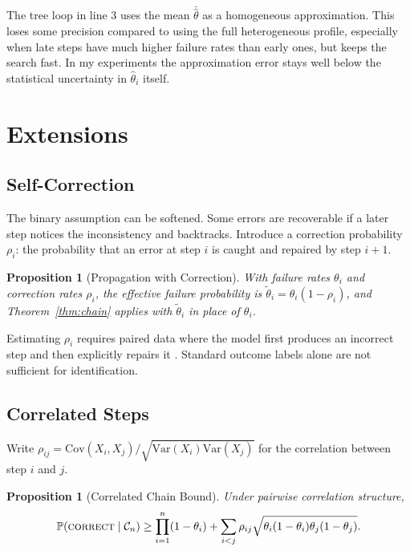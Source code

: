\documentclass[11pt]{article}
\theoremstyle{plain}
\newtheorem{proposition}[theorem]{Proposition}
\theoremstyle{definition}
\newcommand{\Var}{\mathrm{Var}}
\newcommand{\Cov}{\mathrm{Cov}}
\newcommand{\Prob}{\mathbb{P}}
\newcommand{\chain}{\mathcal{C}}
\newcommand{\correct}{\textsc{correct}}
\begin{document}
The tree loop in line 3 uses the mean $\bar{\hat\theta}$ as a homogeneous
approximation. This loses some precision compared to using the full heterogeneous
profile, especially when late steps have much higher failure rates than
early ones, but keeps the search fast. In my experiments the approximation
error stays well below the statistical uncertainty in $\hat\theta_i$ itself.

\section{Extensions}
\label{sec:model-extensions}

\subsection{Self-Correction}

The binary assumption can be softened. Some errors are recoverable if a
later step notices the inconsistency and backtracks. Introduce a correction
probability $\rho_i$: the probability that an error at step $i$ is caught
and repaired by step $i+1$.

\begin{proposition}[Propagation with Correction]\label{prop:correction}
  With failure rates $\theta_i$ and correction rates $\rho_i$, the effective
  failure probability is $\tilde\theta_i = \theta_i(1-\rho_i)$, and
  Theorem~\ref{thm:chain} applies with $\tilde\theta_i$ in place of $\theta_i$.
\end{proposition}

Estimating $\rho_i$ requires paired data where the model first produces an
incorrect step and then explicitly repairs it \citep{madaan2023self}. Standard
outcome labels alone are not sufficient for identification.

\subsection{Correlated Steps}

Write $\rho_{ij} = \Cov(X_i,X_j)/\sqrt{\Var(X_i)\Var(X_j)}$ for the
correlation between step $i$ and $j$.

\begin{proposition}[Correlated Chain Bound]\label{prop:corr}
  Under pairwise correlation structure,
  \[
    \Prob(\correct \mid \chain_n)
    \geq \prod_{i=1}^n(1-\theta_i)
    + \sum_{i < j}\rho_{ij}\sqrt{\theta_i(1-\theta_i)\theta_j(1-\theta_j)}.
  \]
\end{proposition}
\end{document}
